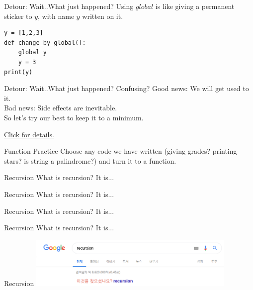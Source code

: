 \documentclass{beamer}
\begin{document}
\begin{frame}[fragile]{Detour: Wait..What just happened?}
  Using $global$ is like giving a permanent sticker to $y$, with name $y$ written
  on it.
  \begin{lstlisting}
y = [1,2,3]
def change_by_global():
    global y
    y = 3
print(y)
  \end{lstlisting}
\end{frame}

\begin{frame}{Detour: Wait..What just happened?}
  Confusing? 
  Good news: We will get used to it.\\
  Bad news: Side effects are inevitable.\\
  So let's try our best to keep it to a minimum.

  \href{https://stackoverflow.com/questions/575196/why-can-a-function-modify-some-arguments-as-perceived-by-the-caller-but-not-oth}{Click
  for details.}
\end{frame}

\begin{frame}{Function Practice}
  Choose any code we have written (giving grades? printing stars? is
  string a palindrome?) and turn it to a function.
\end{frame}

\begin{frame}{Recursion}
  What is recursion?  It is...
\end{frame}

\begin{frame}{Recursion}
  What is recursion?  It is...
\end{frame}

\begin{frame}{Recursion}
  What is recursion?  It is...
\end{frame}

\begin{frame}{Recursion}
  What is recursion?  It is...
\end{frame}

\begin{frame}{Recursion}
  \includegraphics[width=100mm]{./recursion.png}
\end{frame}
\end{document}
